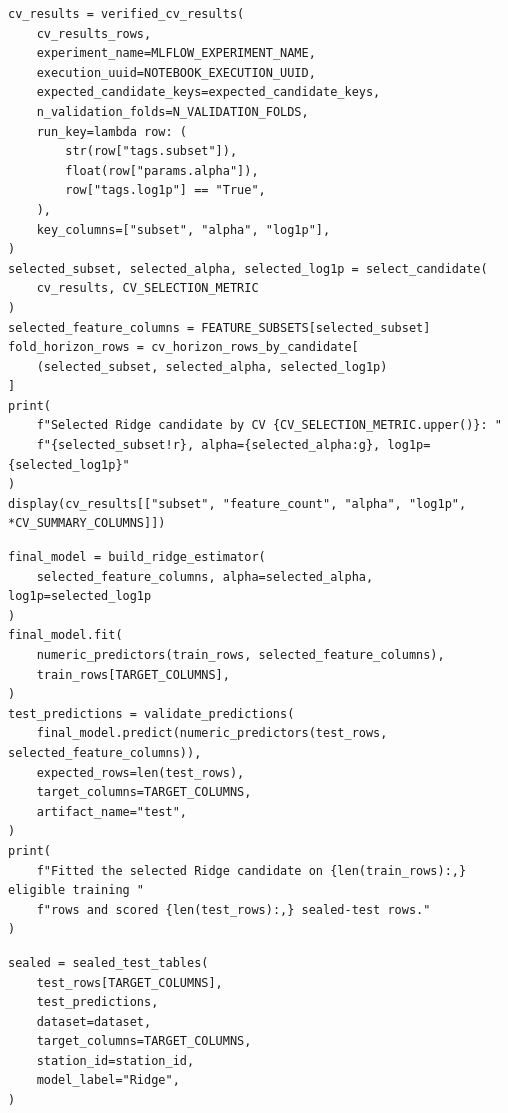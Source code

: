 \begin{verbatim}
cv_results = verified_cv_results(
    cv_results_rows,
    experiment_name=MLFLOW_EXPERIMENT_NAME,
    execution_uuid=NOTEBOOK_EXECUTION_UUID,
    expected_candidate_keys=expected_candidate_keys,
    n_validation_folds=N_VALIDATION_FOLDS,
    run_key=lambda row: (
        str(row["tags.subset"]),
        float(row["params.alpha"]),
        row["tags.log1p"] == "True",
    ),
    key_columns=["subset", "alpha", "log1p"],
)
selected_subset, selected_alpha, selected_log1p = select_candidate(
    cv_results, CV_SELECTION_METRIC
)
selected_feature_columns = FEATURE_SUBSETS[selected_subset]
fold_horizon_rows = cv_horizon_rows_by_candidate[
    (selected_subset, selected_alpha, selected_log1p)
]
print(
    f"Selected Ridge candidate by CV {CV_SELECTION_METRIC.upper()}: "
    f"{selected_subset!r}, alpha={selected_alpha:g}, log1p={selected_log1p}"
)
display(cv_results[["subset", "feature_count", "alpha", "log1p", *CV_SUMMARY_COLUMNS]])
\end{verbatim}

\begin{verbatim}
final_model = build_ridge_estimator(
    selected_feature_columns, alpha=selected_alpha, log1p=selected_log1p
)
final_model.fit(
    numeric_predictors(train_rows, selected_feature_columns),
    train_rows[TARGET_COLUMNS],
)
test_predictions = validate_predictions(
    final_model.predict(numeric_predictors(test_rows, selected_feature_columns)),
    expected_rows=len(test_rows),
    target_columns=TARGET_COLUMNS,
    artifact_name="test",
)
print(
    f"Fitted the selected Ridge candidate on {len(train_rows):,} eligible training "
    f"rows and scored {len(test_rows):,} sealed-test rows."
)
\end{verbatim}

\begin{verbatim}
sealed = sealed_test_tables(
    test_rows[TARGET_COLUMNS],
    test_predictions,
    dataset=dataset,
    target_columns=TARGET_COLUMNS,
    station_id=station_id,
    model_label="Ridge",
)
\end{verbatim}
